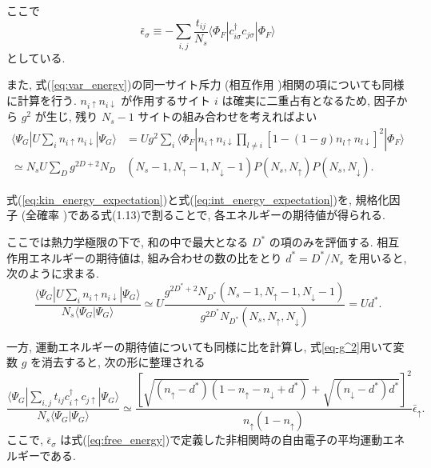 ここで
\begin{equation}
    \bar{\epsilon}_\sigma \equiv - \sum_{i,j} \frac{t_{ij}}{N_s} \langle \Phi_F | c_{i\sigma}^\dagger c_{j\sigma} | \Phi_F \rangle 
    \label{eq:free_energy}
\end{equation}
としている.

また, 式(\ref{eq:var_energy})の同一サイト斥力 (相互作用 )相関の項についても同様に計算を行う. $n_{i\uparrow}n_{i\downarrow}$ が作用するサイト $i$ は確実に二重占有となるため, 因子から $g^2$ が生じ, 残り $N_s - 1$ サイトの組み合わせを考えればよい
\begin{equation}
\begin{split}
    \langle \Psi_G | U \sum_i n_{i\uparrow} n_{i\downarrow} | \Psi_G \rangle 
    &= U g^2 \sum_i \langle \Phi_F | n_{i\uparrow} n_{i\downarrow} \prod_{l \neq i} [1 - (1-g)n_{l\uparrow}n_{l\downarrow}]^2 | \Phi_F \rangle \\
    \simeq N_s U \sum_D g^{2D+2} N_D&(N_s-1, N_\uparrow-1, N_\downarrow-1)P(N_s, N_\uparrow)P(N_s, N_\downarrow).
\end{split}
\label{eq:int_energy_expectation}
\end{equation}

式(\ref{eq:kin_energy_expectation})と式(\ref{eq:int_energy_expectation})を, 規格化因子 (全確率 )である式(1.13)で割ることで, 各エネルギーの期待値が得られる. 

ここでは熱力学極限の下で, 和の中で最大となる $D^*$ の項のみを評価する. 
相互作用エネルギーの期待値は, 組み合わせの数の比をとり $d^* = D^*/N_s$ を用いると, 次のように求まる.
\begin{equation}
    \frac{\langle \Psi_G | U \sum_i n_{i\uparrow} n_{i\downarrow} | \Psi_G \rangle}{N_s \langle \Psi_G | \Psi_G \rangle} 
    \simeq U \frac{g^{2D^*+2} N_{D^*}(N_s-1, N_\uparrow-1, N_\downarrow-1)}{g^{2D^*} N_{D^*}(N_s, N_\uparrow, N_\downarrow)} 
    = U d^* .
    \label{eq:int_energy_final}
\end{equation}

一方, 運動エネルギーの期待値についても同様に比を計算し, 式\ref{eq-g^2}用いて変数 $g$ を消去すると, 次の形に整理される
\begin{equation}
    \frac{\langle \Psi_G | \sum_{i,j} t_{ij} c_{i\uparrow}^\dagger c_{j\uparrow} | \Psi_G \rangle}{N_s \langle \Psi_G | \Psi_G \rangle} 
    \simeq \frac{\left[ \sqrt{(n_\uparrow - d^*)(1 - n_\uparrow - n_\downarrow + d^*)} + \sqrt{(n_\downarrow - d^*)d^*} \right]^2}{n_\uparrow(1 - n_\uparrow)} \bar{\epsilon}_\uparrow .
    \label{eq:kin_energy_final}
\end{equation}
ここで, $\bar{\epsilon}_\sigma$ は式(\ref{eq:free_energy})で定義した非相関時の自由電子の平均運動エネルギーである.


